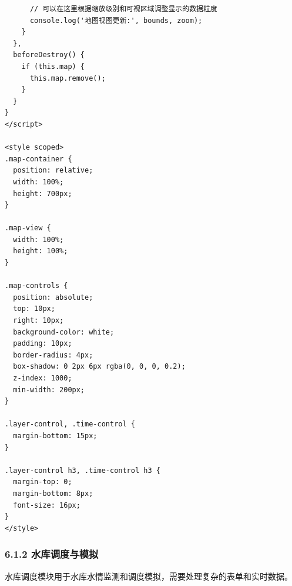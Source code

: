 \begin{lstlisting}
      // 可以在这里根据缩放级别和可视区域调整显示的数据粒度
      console.log('地图视图更新:', bounds, zoom);
    }
  },
  beforeDestroy() {
    if (this.map) {
      this.map.remove();
    }
  }
}
</script>

<style scoped>
.map-container {
  position: relative;
  width: 100%;
  height: 700px;
}

.map-view {
  width: 100%;
  height: 100%;
}

.map-controls {
  position: absolute;
  top: 10px;
  right: 10px;
  background-color: white;
  padding: 10px;
  border-radius: 4px;
  box-shadow: 0 2px 6px rgba(0, 0, 0, 0.2);
  z-index: 1000;
  min-width: 200px;
}

.layer-control, .time-control {
  margin-bottom: 15px;
}

.layer-control h3, .time-control h3 {
  margin-top: 0;
  margin-bottom: 8px;
  font-size: 16px;
}
</style>
\end{lstlisting}

\subsubsection{6.1.2
水库调度与模拟}\label{ux6c34ux5e93ux8c03ux5ea6ux4e0eux6a21ux62df}

水库调度模块用于水库水情监测和调度模拟，需要处理复杂的表单和实时数据。

